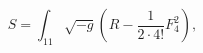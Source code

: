\begin{equation}
\label{eq. elaction}
S=\int _{11}\sqrt{-g}\left( R-\frac{1}{2\cdot 4!}F_{4}^{2}\right) ,
\end{equation}

